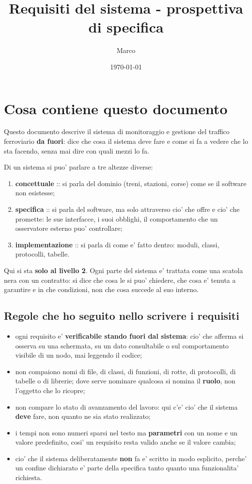 \documentclass[11pt]{article}
\author{Marco}
\date{\today}
\title{Requisiti del sistema - prospettiva di specifica}
\begin{document}
\maketitle
\tableofcontents

\section{Cosa contiene questo documento}
\label{sec:org1136f79}

Questo documento descrive il sistema di monitoraggio e gestione del traffico ferroviario \textbf{da fuori}:
dice che cosa il sistema deve fare e come si fa a vedere che lo sta facendo, senza mai dire con quali
mezzi lo fa.

Di un sistema si puo' parlare a tre altezze diverse:

\begin{enumerate}
\item \textbf{concettuale} :: si parla del dominio (treni, stazioni, corse) come se il software non esistesse;
\item \textbf{specifica} :: si parla del software, ma solo attraverso cio' che offre e cio' che promette: le
sue interfacce, i suoi obblighi, il comportamento che un osservatore esterno puo' controllare;
\item \textbf{implementazione} :: si parla di come e' fatto dentro: moduli, classi, protocolli, tabelle.
\end{enumerate}

Qui si sta \textbf{solo al livello 2}. Ogni parte del sistema e' trattata come una scatola nera con un
contratto: si dice che cosa le si puo' chiedere, che cosa e' tenuta a garantire e in che condizioni,
non che cosa succede al suo interno.
\subsection{Regole che ho seguito nello scrivere i requisiti}
\label{sec:orgd9f32ed}

\begin{itemize}
\item ogni requisito e' \textbf{verificabile stando fuori dal sistema}: cio' che afferma si osserva su una
schermata, su un dato consultabile o sul comportamento visibile di un nodo, mai leggendo il codice;
\item non compaiono nomi di file, di classi, di funzioni, di rotte, di protocolli, di tabelle o di
librerie; dove serve nominare qualcosa si nomina il \textbf{ruolo}, non l'oggetto che lo ricopre;
\item non compare lo stato di avanzamento del lavoro: qui c'e' cio' che il sistema \textbf{deve} fare, non
quanto ne sia stato realizzato;
\item i tempi non sono numeri sparsi nel testo ma \textbf{parametri} con un nome e un valore predefinito, cosi'
un requisito resta valido anche se il valore cambia;
\item cio' che il sistema deliberatamente \textbf{non} fa e' scritto in modo esplicito, perche' un confine
dichiarato e' parte della specifica tanto quanto una funzionalita' richiesta.
\end{itemize}
\end{document}
